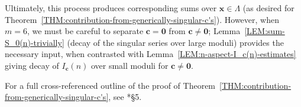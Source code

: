 \documentclass[12pt]{report}
\begin{document}
Ultimately,
this process produces corresponding sums over $\bm{x}\in\Lambda$
(as desired for Theorem~\ref{THM:contribution-from-generically-singular-c's}).
However,
when $m=6$,
we must be careful to separate $\bm{c}=\bm{0}$ from $\bm{c}\neq\bm{0}$;
Lemma~\ref{LEM:sum-S_0(n)-trivially} (decay of the singular series over large moduli)
provides the necessary input,
when contrasted with Lemma~\ref{LEM:n-aspect-I_c(n)-estimates} giving
decay of $I_{\bm{c}}(n)$ over small moduli for $\bm{c}\neq \bm{0}$.

For a full cross-referenced outline of
the proof of Theorem~\ref{THM:contribution-from-generically-singular-c's},
see \cite{wang2021_isolating_special_solutions}*{\S5}.

\end{document}
